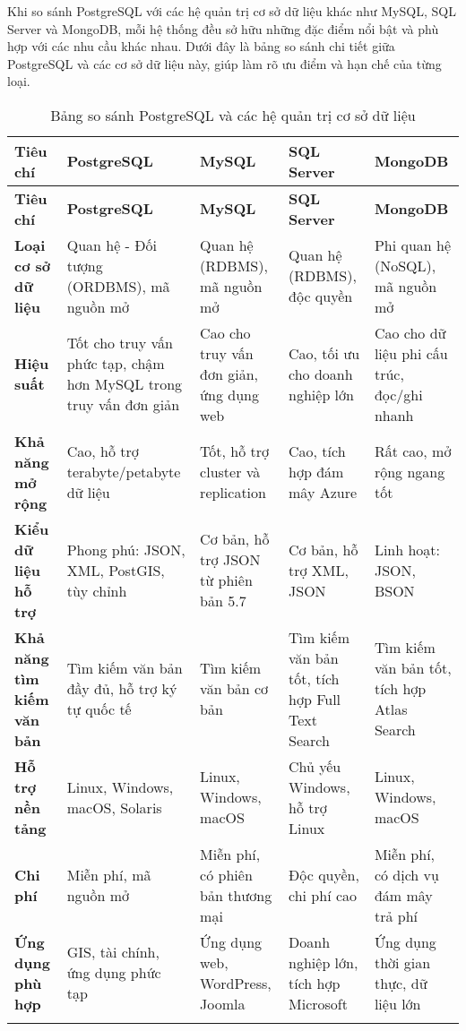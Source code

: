\begin{enumerate}[(a)]
Khi so sánh PostgreSQL với các hệ quản trị cơ sở dữ liệu khác như MySQL, SQL Server và MongoDB, mỗi hệ thống đều sở hữu những đặc điểm nổi bật và phù hợp với các nhu cầu khác nhau. Dưới đây là bảng so sánh chi tiết giữa PostgreSQL và các cơ sở dữ liệu này, giúp làm rõ ưu điểm và hạn chế của từng loại.

\begin{landscape} 
\begin{longtable}{|p{3.5cm}|p{4cm}|p{4cm}|p{4cm}|p{4cm}|}
\hline
\textbf{Tiêu chí} & \textbf{PostgreSQL} & \textbf{MySQL} & \textbf{SQL Server} & \textbf{MongoDB} \\
\hline
\endfirsthead
\hline
\textbf{Tiêu chí} & \textbf{PostgreSQL} & \textbf{MySQL} & \textbf{SQL Server} & \textbf{MongoDB} \\
\hline
\endhead
\hline
\textbf{Loại cơ sở dữ liệu} & Quan hệ - Đối tượng (ORDBMS), mã nguồn mở & Quan hệ (RDBMS), mã nguồn mở & Quan hệ (RDBMS), độc quyền & Phi quan hệ (NoSQL), mã nguồn mở \\
\hline
\textbf{Hiệu suất} & Tốt cho truy vấn phức tạp, chậm hơn MySQL trong truy vấn đơn giản & Cao cho truy vấn đơn giản, ứng dụng web & Cao, tối ưu cho doanh nghiệp lớn & Cao cho dữ liệu phi cấu trúc, đọc/ghi nhanh \\
\hline
\textbf{Khả năng mở rộng} & Cao, hỗ trợ terabyte/petabyte dữ liệu & Tốt, hỗ trợ cluster và replication & Cao, tích hợp đám mây Azure & Rất cao, mở rộng ngang tốt \\
\hline
\textbf{Kiểu dữ liệu hỗ trợ} & Phong phú: JSON, XML, PostGIS, tùy chỉnh & Cơ bản, hỗ trợ JSON từ phiên bản 5.7 & Cơ bản, hỗ trợ XML, JSON & Linh hoạt: JSON, BSON \\
\hline
\textbf{Khả năng tìm kiếm văn bản} & Tìm kiếm văn bản đầy đủ, hỗ trợ ký tự quốc tế & Tìm kiếm văn bản cơ bản & Tìm kiếm văn bản tốt, tích hợp Full Text Search & Tìm kiếm văn bản tốt, tích hợp Atlas Search \\
\hline
\textbf{Hỗ trợ nền tảng} & Linux, Windows, macOS, Solaris & Linux, Windows, macOS & Chủ yếu Windows, hỗ trợ Linux & Linux, Windows, macOS \\
\hline
\textbf{Chi phí} & Miễn phí, mã nguồn mở & Miễn phí, có phiên bản thương mại & Độc quyền, chi phí cao & Miễn phí, có dịch vụ đám mây trả phí \\
\hline
\textbf{Ứng dụng phù hợp} & GIS, tài chính, ứng dụng phức tạp & Ứng dụng web, WordPress, Joomla & Doanh nghiệp lớn, tích hợp Microsoft & Ứng dụng thời gian thực, dữ liệu lớn \\
\hline
\caption{Bảng so sánh PostgreSQL và các hệ quản trị cơ sở dữ liệu}
\end{longtable}
\end{landscape} 

    \end{enumerate}